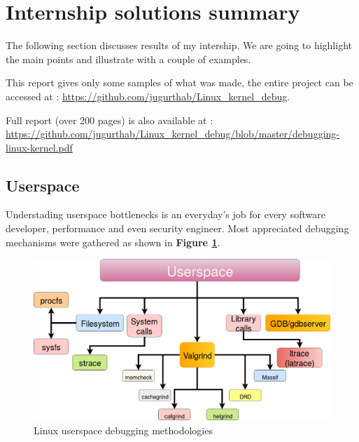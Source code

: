 \section{Internship solutions summary}
The following section discusses results of my intership. We are going to highlight the main points and illustrate with a couple of examples.

\begin{center}
\begin{mdframed}[
        linecolor=red,linewidth=2pt,%
        frametitlerule=true,%
        apptotikzsetting={\tikzset{mdfframetitlebackground/.append style={%
            shade,left color=white, right color=blue!20}}}, 
        frametitlerulecolor=blue,
        frametitlerulewidth=1pt, innertopmargin=\topskip,
        frametitle={About report},
        outerlinewidth=1.25pt
    ]
			This report gives only some samples of what was made, the entire project can be accessed at : {\color{blue}\url{https://github.com/jugurthab/Linux_kernel_debug}}.
			
			Full report (over 200 pages) is also available at : {\color{blue}\url{https://github.com/jugurthab/Linux_kernel_debug/blob/master/debugging-linux-kernel.pdf}}
\end{mdframed}
\end{center}




\subsection{Userspace}
Understading userspace bottlenecks is an everyday's job for every software developer, performance and even security engineer. Most appreciated debugging mechanisms were gathered as shown in \textbf{Figure \ref{Linux userspace debugging methodologies}}.
\begin{figure}[H]
		\centering
        \includegraphics[scale=0.40]{img/solution/userspace.png}
        \caption{Linux userspace debugging methodologies}
        \label{Linux userspace debugging methodologies}
    \end{figure}
 
